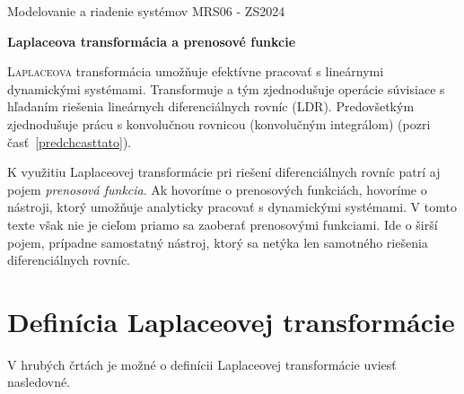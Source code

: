 \documentclass[a4paper, 10pt, ]{article}
\def\oznacenieCasti{MRS06 - ZS2024}
\begin{document}
\lstset{%
style=mystyle,
rangebeginprefix=\#\#\#\ cellB\ ,%
rangebeginsuffix=\ \#\#\#,%
rangeendprefix=\#\#\#\ cellE\ ,%
rangeendsuffix=\ \#\#\#,%
includerangemarker=false,
}





\fontsize{12pt}{22pt}\selectfont

\centerline{\textsf{Modelovanie a riadenie systémov} \hfill \textsf{\oznacenieCasti}}

\fontsize{18pt}{22pt}\selectfont





\begin{flushleft}
	\textbf{\textsf{Laplaceova transformácia a prenosové funkcie}}
\end{flushleft}





\normalsize

\bigskip

{\hypersetup{hidelinks}

\tableofcontents

}

\bigskip

\vspace{18pt}



\noindent
\lettrine[lines=3, nindent=0pt]{L}{aplaceova} transformácia umožňuje efektívne pracovať s lineárnymi dynamickými systémami. Transformuje a tým zjednodušuje operácie súvisiace s hľadaním riešenia lineárnych diferenciálnych rovníc (LDR). Predovšetkým zjednodušuje prácu s konvolučnou rovnicou (konvolučným integrálom) (pozri časť~\ref{predchcasttato}).

K využitiu Laplaceovej transformácie pri riešení diferenciálnych rovníc patrí aj pojem \emph{prenosová funkcia}. Ak hovoríme o prenosových funkciách, hovoríme o nástroji, ktorý umožňuje analyticky pracovať s dynamickými systémami. V tomto texte však nie je cieľom priamo sa zaoberať prenosovými funkciami. Ide o širší pojem, prípadne samostatný nástroj, ktorý sa netýka len samotného riešenia diferenciálnych rovníc.




\section{Definícia Laplaceovej transformácie}

V hrubých črtách je možné o definícii Laplaceovej transformácie uviesť nasledovné.
\end{document}

